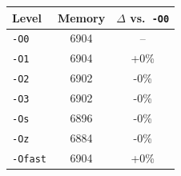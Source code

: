 \begin{tabular*}{\columnwidth}{@{\extracolsep\fill}lcc@{\extracolsep\fill}}
\toprule
\textbf{Level} & \textbf{Memory} & \textbf{$\Delta$ vs.\ \texttt{-O0}} \\
\midrule
\texttt{-O0} & 6904 & -- \\
\texttt{-O1} & 6904 & +0\% \\
\texttt{-O2} & 6902 & -0\% \\
\texttt{-O3} & 6902 & -0\% \\
\texttt{-Os} & 6896 & -0\% \\
\texttt{-Oz} & 6884 & -0\% \\
\texttt{-Ofast} & 6904 & +0\% \\
\bottomrule
\end{tabular*}
